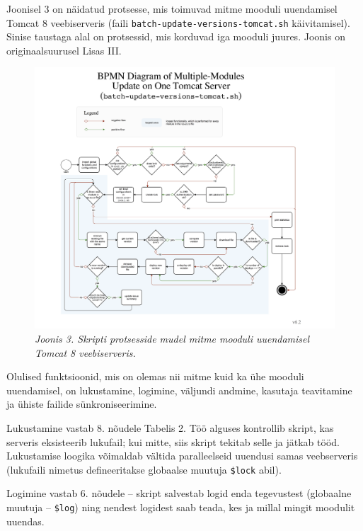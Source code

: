 \documentclass[12pt]{article}
\newcommand{\code}[1]{\texttt{#1}}
\begin{document}
   Joonisel 3 on näidatud protsesse, mis toimuvad mitme mooduli uuendamisel Tomcat 8 veebiserveris (faili \code{batch-update-versions-tomcat.sh} käivitamisel). Sinise taustaga alal on protsessid, mis korduvad iga mooduli juures. Joonis on originaalsuurusel Lisas III.
   
   \begin{figure}[H]
     \begin{center}
       \includegraphics[width=\textwidth]{diagrams/BPMN-diagram-multiple-module-update-tomcat.png}
       \caption*{\textit{Joonis 3. Skripti protsesside mudel mitme mooduli uuendamisel Tomcat 8 veebiserveris.}}
     \end{center}
   \end{figure}
   
   \newpage
   
   Olulised funktsioonid, mis on olemas nii mitme kuid ka ühe mooduli uuendamisel, on lukustamine, logimine, väljundi andmine, kasutaja teavitamine ja ühiste failide sünkroniseerimine.
   
   Lukustamine vastab 8. nõudele Tabelis 2. Töö alguses kontrollib skript, kas serveris eksisteerib lukufail; kui mitte, siis skript tekitab selle ja jätkab tööd. Lukustamise loogika võimaldab vältida paralleelseid uuendusi samas veebserveris (lukufaili nimetus defineeritakse globaalse muutuja \code{\$lock} abil).
   
   Logimine vastab 6. nõudele \--- skript salvestab logid enda tegevustest (globaalne muutuja \--- \code{\$log}) ning nendest logidest saab teada, kes ja millal mingit moodulit uuendas.
   
\end{document}
